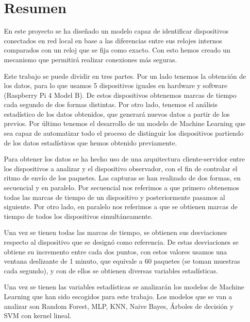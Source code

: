 
\chapter*{Resumen}
 \label{chap:resumen}

En este proyecto se ha diseñado un modelo capaz de identificar dispositivos conectados en red local en base a las diferencias entre sus relojes internos comparados con un reloj que se fija como exacto. Con esto hemos creado un mecanismo que permitirá realizar conexiones más seguras.

Este trabajo se puede dividir en tres partes. Por un lado tenemos la obtención de los datos, para lo que usamos 5 dispositivos iguales en hardware y software (Raspberry Pi 4 Model B). De estos dispositivos obtenemos marcas de tiempo cada segundo de dos formas distintas. Por otro lado, tenemos el análisis estadístico de los datos obtenidos, que generará nuevos datos a partir de los previos. Por último tenemos el desarrollo de un modelo de Machine Learning que sea capaz de automatizar todo el proceso de distinguir los dispositivos partiendo de los datos estadísticos que hemos obtenido previamente.

Para obtener los datos se ha hecho uso de una arquitectura cliente-servidor entre los dispositivos a analizar y el dispositivo observador, con el fin de controlar el ritmo de envío de los paquetes. Las capturas se han realizado de dos formas, en secuencial y en paralelo. Por secuencial nos referimos a que primero obtenemos todas las marcas de tiempo de un dispositivo y posteriormente pasamos al siguiente. Por otro lado, en paralelo nos referimos a que se obtienen marcas de tiempo de todos los dispositivos simultáneamente.

Una vez se tienen todas las marcas de tiempo, se obtienen sus desviaciones respecto al dispositivo que se designó como referencia. De estas desviaciones se obtiene su incremento entre cada dos puntos, con estos valores usamos una ventana deslizante de 1 minuto, que equivale a 60 paquetes (se toman muestras cada segundo), y con de ellos se obtienen diversas variables estadísticas.

Una vez se tienen las variables estadísticas se analizarán los modelos de Machine Learning que han sido escogidos para este trabajo. Los modelos que se van a analizar son Random Forest, MLP, KNN, Naive Bayes, Árboles de decisión y SVM con kernel lineal. 

